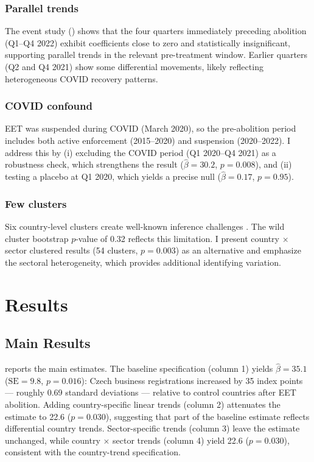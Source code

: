 \documentclass[12pt]{article}
\begin{document}
\subsubsection*{Parallel trends} The event study () shows that the four quarters immediately preceding abolition (Q1--Q4 2022) exhibit coefficients close to zero and statistically insignificant, supporting parallel trends in the relevant pre-treatment window. Earlier quarters (Q2 and Q4 2021) show some differential movements, likely reflecting heterogeneous COVID recovery patterns.

\subsubsection*{COVID confound} EET was suspended during COVID (March 2020), so the pre-abolition period includes both active enforcement (2015--2020) and suspension (2020--2022). I address this by (i) excluding the COVID period (Q1 2020--Q4 2021) as a robustness check, which strengthens the result ($\hat{\beta} = 30.2$, $p = 0.008$), and (ii) testing a placebo at Q1 2020, which yields a precise null ($\hat{\beta} = 0.17$, $p = 0.95$).

\subsubsection*{Few clusters} Six country-level clusters create well-known inference challenges \citep{cameron2015practitioners}. The wild cluster bootstrap $p$-value of 0.32 reflects this limitation. I present country $\times$ sector clustered results (54 clusters, $p = 0.003$) as an alternative and emphasize the sectoral heterogeneity, which provides additional identifying variation.


\section{Results}

\subsection{Main Results}

 reports the main estimates. The baseline specification (column 1) yields $\hat{\beta} = 35.1$ ($\text{SE} = 9.8$, $p = 0.016$): Czech business registrations increased by 35 index points --- roughly 0.69 standard deviations --- relative to control countries after EET abolition. Adding country-specific linear trends (column 2) attenuates the estimate to 22.6 ($p = 0.030$), suggesting that part of the baseline estimate reflects differential country trends. Sector-specific trends (column 3) leave the estimate unchanged, while country $\times$ sector trends (column 4) yield 22.6 ($p = 0.030$), consistent with the country-trend specification.
\end{document}
